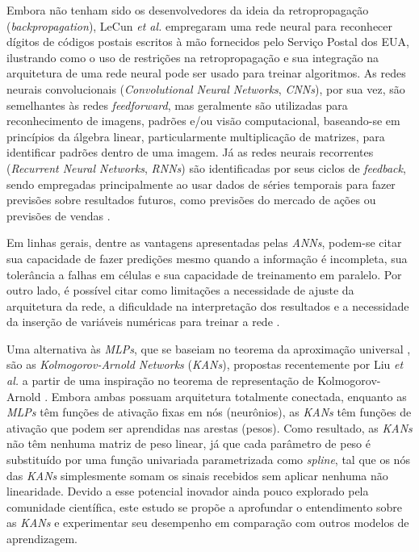 \documentclass[journal]{IEEEtran}
\begin{document}
Embora não tenham sido os desenvolvedores da ideia da retropropagação (\textit{backpropagation}), LeCun \textit{et al.} \cite{lecun} empregaram uma rede neural para reconhecer dígitos de códigos postais escritos à mão fornecidos pelo Serviço Postal dos EUA, ilustrando como o uso de restrições na retropropagação e sua integração na arquitetura de uma rede neural pode ser usado para treinar algoritmos. As redes neurais convolucionais (\textit{Convolutional Neural Networks}, \textit{CNNs}), por sua vez, são semelhantes às redes \textit{feedforward}, mas geralmente são utilizadas para reconhecimento de imagens, padrões e/ou visão computacional, baseando-se em princípios da álgebra linear, particularmente multiplicação de matrizes, para identificar padrões dentro de uma imagem. Já as redes neurais recorrentes (\textit{Recurrent Neural Networks}, \textit{RNNs}) são identificadas por seus ciclos de \textit{feedback}, sendo empregadas principalmente ao usar dados de séries temporais para fazer previsões sobre resultados futuros, como previsões do mercado de ações ou previsões de vendas \cite{ibm}.

Em linhas gerais, dentre as vantagens apresentadas pelas \textit{ANNs}, podem-se citar sua capacidade de fazer predições mesmo quando a informação é incompleta, sua tolerância a falhas em células e sua capacidade de treinamento em paralelo. Por outro lado, é possível citar como limitações a necessidade de ajuste da arquitetura da rede, a dificuldade na interpretação dos resultados e a necessidade da inserção de variáveis numéricas para treinar a rede \cite{khalilov}.

Uma alternativa às \textit{MLPs}, que se baseiam no teorema da aproximação universal \cite{hornik}, são as \textit{Kolmogorov-Arnold Networks} (\textit{KANs}), propostas recentemente por Liu \textit{et al.} \cite{liu} a partir de uma inspiração no teorema de representação de Kolmogorov-Arnold \cite{kolmogorov, arnold}. Embora ambas possuam arquitetura totalmente conectada, enquanto as \textit{MLPs} têm funções de ativação fixas em nós (neurônios), as \textit{KANs} têm funções de ativação que podem ser aprendidas nas arestas (pesos). Como resultado, as \textit{KANs} não têm nenhuma matriz de peso linear, já que cada parâmetro de peso é substituído por uma função univariada parametrizada como \textit{spline}, tal que os nós das \textit{KANs} simplesmente somam os sinais recebidos sem aplicar nenhuma não linearidade. Devido a esse potencial inovador ainda pouco explorado pela comunidade científica, este estudo se propõe a aprofundar o entendimento sobre as \textit{KANs} e experimentar seu desempenho em comparação com outros modelos de aprendizagem.
\end{document}
